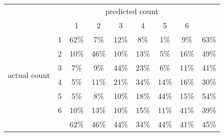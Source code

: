 
\begin{tabular}{*{9}{c}}
& & \multicolumn{6}{c}{predicted count} & \\
& & 1 & 2 & 3 & 4 & 5 & 6 & \\
\multirow{6}{*}{\begin{sideways}actual count\end{sideways}}
& 1 & \cellcolor[rgb]{0.000000,1.000000,0.000000}62\% & \cellcolor[rgb]{0.975443,0.024557,0.000000}7\% & \cellcolor[rgb]{0.841309,0.158691,0.000000}12\% & \cellcolor[rgb]{0.971887,0.028113,0.000000}8\% & \cellcolor[rgb]{0.997938,0.002062,0.000000}1\% & \cellcolor[rgb]{0.960675,0.039325,0.000000}9\% & \cellcolor[rgb]{0.000000,1.000000,0.000000}63\%\\
& 2 & \cellcolor[rgb]{0.933406,0.066594,0.000000}10\% & \cellcolor[rgb]{0.000009,0.999991,0.000000}46\% & \cellcolor[rgb]{0.933406,0.066594,0.000000}10\% & \cellcolor[rgb]{0.831816,0.168184,0.000000}13\% & \cellcolor[rgb]{0.989177,0.010823,0.000000}5\% & \cellcolor[rgb]{0.569328,0.430672,0.000000}16\% & \cellcolor[rgb]{0.000002,0.999998,0.000000}49\%\\
& 3 & \cellcolor[rgb]{0.979969,0.020031,0.000000}7\% & \cellcolor[rgb]{0.960675,0.039325,0.000000}9\% & \cellcolor[rgb]{0.000018,0.999982,0.000000}44\% & \cellcolor[rgb]{0.071219,0.928781,0.000000}23\% & \cellcolor[rgb]{0.984753,0.015247,0.000000}6\% & \cellcolor[rgb]{0.902345,0.097655,0.000000}11\% & \cellcolor[rgb]{0.000061,0.999939,0.000000}41\%\\
& 4 & \cellcolor[rgb]{0.989896,0.010104,0.000000}5\% & \cellcolor[rgb]{0.919227,0.080773,0.000000}11\% & \cellcolor[rgb]{0.159047,0.840953,0.000000}21\% & \cellcolor[rgb]{0.001187,0.998813,0.000000}34\% & \cellcolor[rgb]{0.739428,0.260572,0.000000}14\% & \cellcolor[rgb]{0.586267,0.413733,0.000000}16\% & \cellcolor[rgb]{0.004192,0.995808,0.000000}30\%\\
& 5 & \cellcolor[rgb]{0.990567,0.009433,0.000000}5\% & \cellcolor[rgb]{0.971887,0.028113,0.000000}8\% & \cellcolor[rgb]{0.933406,0.066594,0.000000}10\% & \cellcolor[rgb]{0.333341,0.666659,0.000000}18\% & \cellcolor[rgb]{0.000017,0.999983,0.000000}44\% & \cellcolor[rgb]{0.697341,0.302659,0.000000}15\% & \cellcolor[rgb]{0.000000,1.000000,0.000000}54\%\\
& 6 & \cellcolor[rgb]{0.945244,0.054756,0.000000}10\% & \cellcolor[rgb]{0.811482,0.188518,0.000000}13\% & \cellcolor[rgb]{0.937595,0.062405,0.000000}10\% & \cellcolor[rgb]{0.667251,0.332749,0.000000}15\% & \cellcolor[rgb]{0.902345,0.097655,0.000000}11\% & \cellcolor[rgb]{0.000049,0.999951,0.000000}41\% & \cellcolor[rgb]{0.000158,0.999842,0.000000}39\%\\
&   & \cellcolor[rgb]{0.000000,1.000000,0.000000}62\% & \cellcolor[rgb]{0.000009,0.999991,0.000000}46\% & \cellcolor[rgb]{0.000018,0.999982,0.000000}44\% & \cellcolor[rgb]{0.001187,0.998813,0.000000}34\% & \cellcolor[rgb]{0.000017,0.999983,0.000000}44\% & \cellcolor[rgb]{0.000049,0.999951,0.000000}41\% & \cellcolor[rgb]{0.000011,0.999989,0.000000}45\%\\
\end{tabular}
